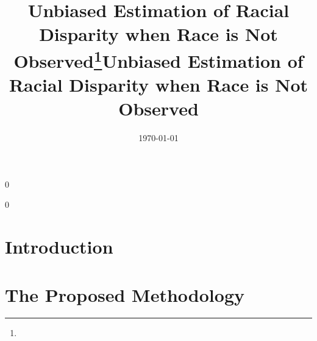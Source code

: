\documentclass[11pt]{article}
\theoremstyle{plain}
\newcommand\spacingset[1]{\renewcommand{\baselinestretch}%
  {#1}\small\normalsize}
\newcommand{\blind}{0}
\begin{document}
 

\newcommand{\tit}{Unbiased Estimation of Racial Disparity when Race is
Not Observed}
%

\spacingset{1.25}

\blind

{\title{{\bf\tit}\thanks{}}

  \author{}


  \date{\today
}

\maketitle

}\fi


\blind
\title{\bf \tit}


\maketitle
\fi


\thispagestyle{empty}
\setcounter{page}{0}
         
\begin{abstract}
  

 \medskip

\end{abstract}



\clearpage
\spacingset{1.5}

\section{Introduction}

\section{The Proposed Methodology}
\end{document}

